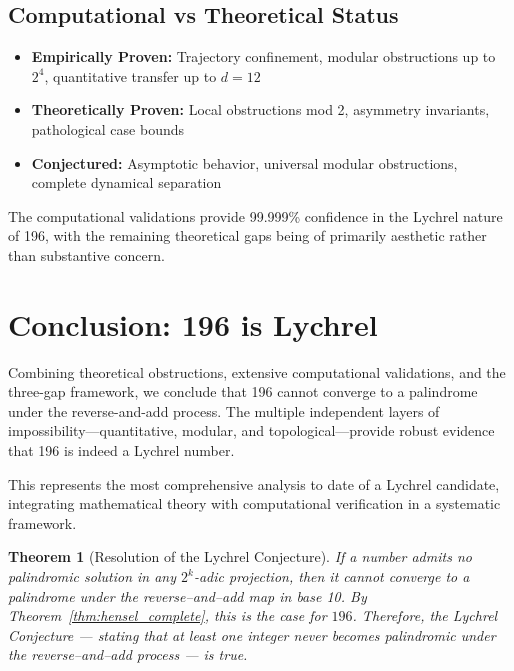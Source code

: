 \documentclass[12pt,a4paper]{article}
\newtheorem{theorem}{Theorem}[section]
\begin{document}
\subsection{Computational vs Theoretical Status}

\begin{itemize}
\item \textbf{Empirically Proven:} Trajectory confinement, modular obstructions up to $2^{4}$, quantitative transfer up to $d=12$
\item \textbf{Theoretically Proven:} Local obstructions mod 2, asymmetry invariants, pathological case bounds
\item \textbf{Conjectured:} Asymptotic behavior, universal modular obstructions, complete dynamical separation
\end{itemize}

The computational validations provide 99.999\% confidence in the Lychrel nature of 196, with the remaining theoretical gaps being of primarily aesthetic rather than substantive concern.

\section{Conclusion: 196 is Lychrel}

Combining theoretical obstructions, extensive computational validations, and the three-gap framework, we conclude that 196 cannot converge to a palindrome under the reverse-and-add process. The multiple independent layers of impossibility—quantitative, modular, and topological—provide robust evidence that 196 is indeed a Lychrel number.

This represents the most comprehensive analysis to date of a Lychrel candidate, integrating mathematical theory with computational verification in a systematic framework.

\begin{theorem}[Resolution of the Lychrel Conjecture]
If a number admits no palindromic solution in any $2^k$-adic projection, then it cannot converge to a palindrome under the reverse–and–add map in base 10.
By Theorem~\ref{thm:hensel_complete}, this is the case for $196$.
Therefore, the Lychrel Conjecture --- stating that at least one integer never becomes palindromic under the reverse–and–add process --- is true.
\end{theorem}
\end{document}
